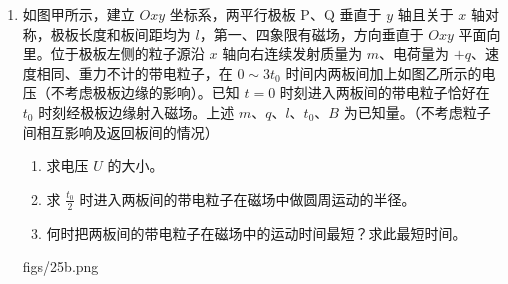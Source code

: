 \documentclass[\gkver]{gaokaozhenti}
\begin{document}
\begin{enumerate}
{（2）若滑上木板 A 时，木板不动，由受力分析得 $\mu_{1}m_{1}g\leq\mu_{2}(m_{1}+2m_{2})g$ ④；若滑上木板 B 时，木板 B 开始滑动，由受力分析得 $\mu_{1}m_{1}g>\mu_{2}(m_{1}+m_{2})g$ ⑤。联立④⑤式代入数据得 $0.4<\mu_{1}\leq0.6$ ⑥。

（3）$\mu_{1}=0.5$，由⑥式可知，货物在木板 A 上滑动时，木板不动。设货物在木板 A 上做减速运动时的加速度大小为 $a_{1}$，由牛顿第二定律得 $\mu_{1}m_{1}g=m_{1}a_{1}$ ⑦，设货物滑到木板 A 末端时的速度为 $v_{1}$，由运动学公式得 $v_{1}^{2}-v_{0}^{2}=-2a_{1}l$ ⑧，联立①⑦⑧式代入数据得 $v_{1}=4\Ums$ ⑨，设在木板 A 上运动的时间为 $t$，由运动学公式得 $v_{1}=v_{0}-a_{1}t$ ⑩，联立①⑦⑨⑩式代入数据得 $t=0.4\Us$。
}

\item
如图甲所示，建立 $Oxy$ 坐标系，两平行极板 P、Q 垂直于 $y$ 轴且关于 $x$ 轴对称，极板长度和板间距均为 $l$，第一、四象限有磁场，方向垂直于 $Oxy$ 平面向里。位于极板左侧的粒子源沿 $x$ 轴向右连续发射质量为 $m$、电荷量为 $+q$、速度相同、重力不计的带电粒子，在 $0\sim3t_{0}$ 时间内两板间加上如图乙所示的电压（不考虑极板边缘的影响）。已知 $t=0$ 时刻进入两板间的带电粒子恰好在 $t_{0}$ 时刻经极板边缘射入磁场。上述 $m$、$q$、$l$、$t_{0}$、$B$ 为已知量。（不考虑粒子间相互影响及返回板间的情况）

\begin{enumerate}
	\item
	求电压 $U$ 的大小。

	\item
	求 $\frac{t_{0}}{2}$ 时进入两板间的带电粒子在磁场中做圆周运动的半径。

	\item
	何时把两板间的带电粒子在磁场中的运动时间最短？求此最短时间。
\end{enumerate}
{figs/25b.png}

\end{enumerate}
\end{document}
